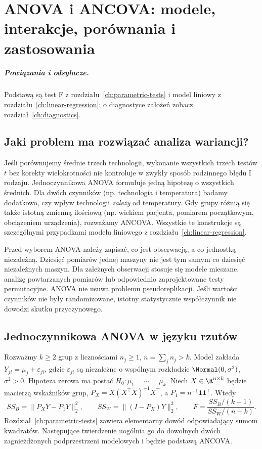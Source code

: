 \chapter{ANOVA i ANCOVA: modele, interakcje, porównania i zastosowania}
\label{ch:anova-ancova}
\paragraph{Powiązania i odsyłacze.} Podstawą są test F z rozdziału~\ref{ch:parametric-tests} i model liniowy z rozdziału~\ref{ch:linear-regression}; o diagnostyce założeń zobacz rozdział~\ref{ch:diagnostics}.


\section{Jaki problem ma rozwiązać analiza wariancji?}
Jeśli porównujemy średnie trzech technologii, wykonanie wszystkich trzech testów $t$ bez korekty wielokrotności nie kontroluje w zwykły sposób rodzinnego błędu I rodzaju. Jednoczynnikowa ANOVA formułuje jedną hipotezę o wszystkich średnich. Dla dwóch czynników (np. technologia i temperatura) badamy dodatkowo, czy wpływ technologii \emph{zależy} od temperatury. Gdy grupy różnią się także istotną zmienną ilościową (np. wiekiem pacjenta, pomiarem początkowym, obciążeniem urządzenia), rozważamy ANCOVA. Wszystkie te konstrukcje są szczególnymi przypadkami modelu liniowego z rozdziału~\ref{ch:linear-regression}.

\begin{uwaga}
Przed wyborem ANOVA należy zapisać, co jest obserwacją, a co jednostką niezależną. Dziesięć pomiarów jednej maszyny nie jest tym samym co dziesięć niezależnych maszyn. Dla zależnych obserwacji stosuje się modele mieszane, analizę powtarzanych pomiarów lub odpowiednio zaprojektowane testy permutacyjne. ANOVA nie usuwa problemu pseudoreplikacji. Jeśli wartości czynników nie były randomizowane, istotny statystycznie współczynnik nie dowodzi skutku przyczynowego.
\end{uwaga}

\section{Jednoczynnikowa ANOVA w języku rzutów}
Rozważmy $k\ge2$ grup z licznościami $n_j\ge1$, $n=\sum_jn_j>k$. Model zakłada $Y_{ji}=\mu_j+\varepsilon_{ji}$, gdzie $\varepsilon_{ji}$ są niezależne o wspólnym rozkładzie $\Normal(0,\sigma^2)$, $\sigma^2>0$. Hipoteza zerowa ma postać $H_0:\mu_1=\cdots=\mu_k$. Niech $X\in\R^{n\times k}$ będzie macierzą wskaźników grup, $P_X=X(X^\top X)^{-1}X^\top$, a $P_1=n^{-1}\mathbf1\mathbf1^\top$. Wtedy
\[
 SS_B=\|P_XY-P_1Y\|_2^2,\qquad
 SS_W=\|(I-P_X)Y\|_2^2,\qquad
 F=\frac{SS_B/(k-1)}{SS_W/(n-k)}.
\]
Rozdział~\ref{ch:parametric-tests} zawiera elementarny dowód odpowiadający sumom kwadratów. Następujące twierdzenie uogólnia go do dowolnych dwóch zagnieżdżonych podprzestrzeni modelowych i będzie podstawą ANCOVA.

